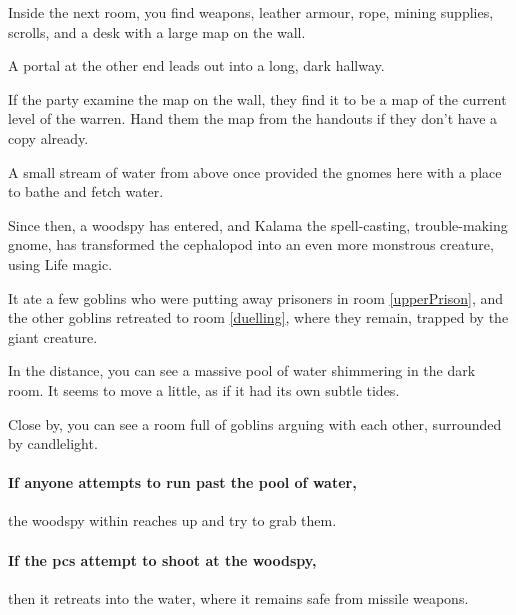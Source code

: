 \begin{multicols}{2}
\begin{boxtext}

  Inside the next room, you find weapons, leather armour, rope, mining supplies, scrolls, and a desk with a large map on the wall.

  A portal at the other end leads out into a long, dark hallway.

\end{boxtext}

If the party examine the map on the wall, they find it to be a map of the current level of the warren.
Hand them the map from the handouts if they don't have a copy already.


\begin{exampletext}

  A small stream of water from above once provided the gnomes here with a place to bathe and fetch water.

  Since then, a woodspy has entered, and Kalama the spell-casting, trouble-making gnome, has transformed the cephalopod into an even more monstrous creature, using Life magic.

  It ate a few goblins who were putting away prisoners in room \ref{upperPrison}, and the other goblins retreated to room \ref{duelling}, where they remain, trapped by the giant creature.

\end{exampletext}

\begin{boxtext}

  In the distance, you can see a massive pool of water shimmering in the dark room.
  It seems to move a little, as if it had its own subtle tides.

  Close by, you can see a room full of goblins arguing with each other, surrounded by candlelight.

\end{boxtext}


\paragraph{If anyone attempts to run past the pool of water,}
the woodspy within reaches up and try to grab them.

\paragraph{If the \glspl{pc} attempt to shoot at the woodspy,}
then it retreats into the water, where it remains safe from missile weapons.


\end{multicols}
